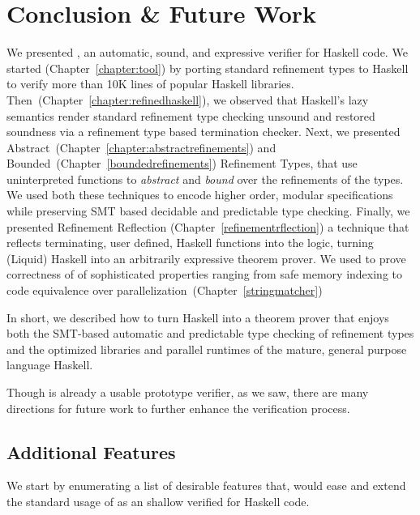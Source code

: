 \chapter{Conclusion \& Future Work}\label{chapter:conclusion}
\label{future:fp}
\label{future:intersection}
\label{future:proofautomation}
\label{future:continuations}
\label{future:gradual}
\label{future:errorreporting}
\label{future:ghost}

We presented \toolname, an automatic, sound, and expressive verifier for Haskell code. 
%
We started (Chapter~\ref{chapter:tool}) by porting standard refinement types 
to Haskell to verify more than 10K lines of popular Haskell libraries. 
%
Then~(Chapter~\ref{chapter:refinedhaskell}), we observed that Haskell's 
lazy semantics render standard refinement type checking unsound
and restored soundness via a refinement type based termination checker.
%
Next, we presented Abstract~(Chapter~\ref{chapter:abstractrefinements}) 
and Bounded~(Chapter~\ref{boundedrefinements}) Refinement Types, 
that use uninterpreted functions to 
\textit{abstract} and \textit{bound} over the refinements of the types. 
We used both these techniques to encode higher order, modular specifications
while preserving SMT based decidable and predictable type checking. 
%
Finally, we presented Refinement Reflection (Chapter~\ref{refinementrflection})
a technique that reflects terminating, user defined, 
Haskell functions into the logic, 
turning (Liquid) Haskell into an arbitrarily expressive 
theorem prover. 
%
We used \toolname to prove correctness of 
of sophisticated properties ranging from 
safe memory indexing to code equivalence over parallelization~(Chapter~\ref{stringmatcher})

In short, we described how to turn Haskell into a theorem prover
that enjoys both 
the SMT-based automatic and predictable type checking
of refinement types
and 
the optimized libraries and parallel runtimes of 
the mature, general purpose language Haskell.

Though \toolname is already a usable prototype verifier, 
as we saw, there are many directions for future work
to further enhance the verification process.

\section{Additional Features}
We start by enumerating a list of desirable features 
that, would ease and extend the standard usage of \toolname
as an shallow verified for Haskell code. 

